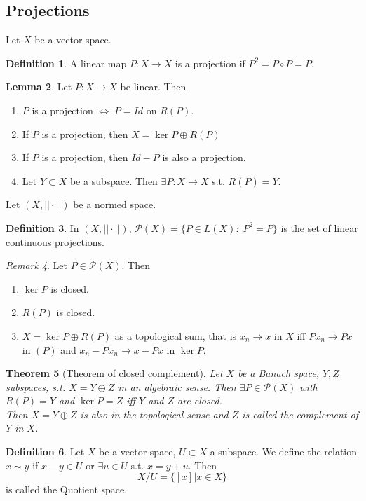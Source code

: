\documentclass[a4paper, 12pt]{article}
\theoremstyle{plain}
\newtheorem{theorem}{Theorem}[subsection] %
\theoremstyle{definition}
\newtheorem{definition}[theorem]{Definition} %
\theoremstyle{lemma}
\newtheorem{lemma}[theorem]{Lemma}
\theoremstyle{remark}
\newtheorem{remark}[theorem]{Remark}
\theoremstyle{corollary}
\theoremstyle{example}
\begin{document}
	\subsection{Projections}
	Let $X$ be a vector space.
	\begin{definition}
		A linear map $P: X \to X$ is a projection if $P^2 = P\circ P = P$.
	\end{definition}
	\begin{lemma}
		Let $P: X \to X$ be linear. Then \begin{enumerate}
			\item $P$ is a projection $\iff \; P = Id$ on $R(P)$.
			\item If $P$ is a projection, then $X = \ker P \oplus R(P)$
			\item If $P$ is a projection, then $Id-P$ is also a projection.
			\item Let $Y\subset X$ be a subspace. Then $\exists P:X\to X$ s.t. $R(P) = Y$.
		\end{enumerate}
	\end{lemma}
	Let $(X,||\cdot||)$ be a normed space.
	\begin{definition}
		In $(X,||\cdot||)$, $\mathcal{P}(X) = \{P \in L(X): \; P^2 = P\}$ is the set of linear continuous projections.
	\end{definition}
	\begin{remark}
		Let $P \in \mathcal{P}(X)$. Then \begin{enumerate}
			\item $\ker P$ is closed.
			\item $R(P)$ is closed.
			\item $X = \ker P \oplus R(P)$ as a topological sum, that is $x_n \to x$ in $X$ iff $Px_n \to Px$ in $(P)$ and $x_n-Px_n \to x-Px$ in $\ker P$.
		\end{enumerate}
	\end{remark}
	\begin{theorem}[Theorem of closed complement]
		Let $X$ be a Banach space, $Y,Z$ subspaces, s.t. $X = Y\oplus Z$ in an algebraic sense. Then $\exists P \in \mathcal{P}(X)$ with $R(P) = Y$ and $\ker P = Z$ iff $Y$ and $Z$ are closed.\\
		Then $X = Y\oplus Z$ is also in the topological sense and $Z$ is called the complement of $Y$ in $X$. 
	\end{theorem}
	\begin{definition}
		Let $X$ be a vector space, $U \subset X$ a subspace. We define the relation $x\sim y$ if $x-y \in U$ or $\exists u \in U$ s.t. $x=y+u$. Then \[X/U = \{[x]| x \in X\}\] is called the Quotient space.
	\end{definition}
\end{document}
